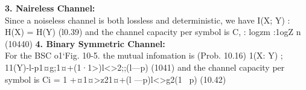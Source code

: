\documentclass[a4]{beamer}
\begin{document}
\begin{frame}
\textbf{3. Naireless Channel:}\\
Since a noiseless channel is both lossless and deterministic, we have
I(X; Y) : H(X) = H(Y) (l0.39)
and the channel capacity per symbol is
C, : logzm :1ogZ n (10440)
\textbf{4. Binary Symmetric Channel:}\\
For the BSC o1`Fig. 10-5. the mutual infomation is (Prob. 10.16)
1(X: Y) ; 11(Y)-l-p1¤g;1¤+(1·1>)l<>2;;(l—p) (1041)
and the channel capacity per symbol is
Ci = 1 +¤1¤>z21¤+(l —p)l<>g2(1 ~p) (10.42)
\end{frame}


\end{document}
